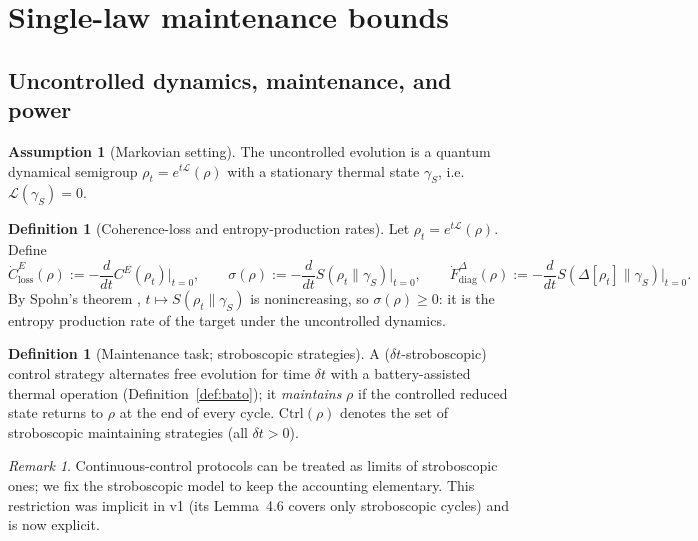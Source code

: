 \documentclass[11pt,a4paper]{article}
\theoremstyle{plain}
\theoremstyle{definition}
\newtheorem{definition}[theorem]{Definition}
\newtheorem{assumption}[theorem]{Assumption}
\theoremstyle{remark}
\newtheorem{remark}[theorem]{Remark}
\newcommand{\Ctrl}{\mathrm{Ctrl}}
\newcommand{\Fdiag}{\dot{F}^{\Delta}_{\mathrm{diag}}}
\begin{document}
\section{Single-law maintenance bounds}\label{sec:bounds}

\subsection{Uncontrolled dynamics, maintenance, and power}

\begin{assumption}[Markovian setting]\label{ass:markov}
The uncontrolled evolution is a quantum dynamical semigroup
$\rho_t = e^{t\mathcal{L}}(\rho)$ with a stationary thermal state $\gamma_S$,
i.e.\ $\mathcal{L}(\gamma_S) = 0$.
\end{assumption}

\begin{definition}[Coherence-loss and entropy-production rates]\label{def:rates}
Let $\rho_t = e^{t\mathcal{L}}(\rho)$. Define
\begin{equation}
\dot{C}^E_{\mathrm{loss}}(\rho) := -\frac{d}{dt} C^E(\rho_t)\Big|_{t=0},
\qquad
\sigma(\rho) := -\frac{d}{dt} S(\rho_t\|\gamma_S)\Big|_{t=0},
\qquad
\Fdiag(\rho) := -\frac{d}{dt} S(\Delta[\rho_t]\|\gamma_S)\Big|_{t=0}.
\end{equation}
By Spohn's theorem \cite{Spohn78}, $t \mapsto S(\rho_t\|\gamma_S)$ is
nonincreasing, so $\sigma(\rho) \ge 0$: it is the entropy production rate of
the target under the uncontrolled dynamics.
\end{definition}

\begin{definition}[Maintenance task; stroboscopic strategies]\label{def:maintain}
A ($\delta t$-stroboscopic) control strategy alternates free evolution for time
$\delta t$ with a battery-assisted thermal operation
(Definition~\ref{def:bato}); it \emph{maintains} $\rho$ if the controlled
reduced state returns to $\rho$ at the end of every cycle. $\Ctrl(\rho)$
denotes the set of stroboscopic maintaining strategies (all $\delta t > 0$).
\end{definition}

\begin{remark}
Continuous-control protocols can be treated as limits of stroboscopic ones; we
fix the stroboscopic model to keep the accounting elementary. This restriction
was implicit in v1 (its Lemma~4.6 covers only stroboscopic cycles) and is now
explicit.
\end{remark}
\end{document}
